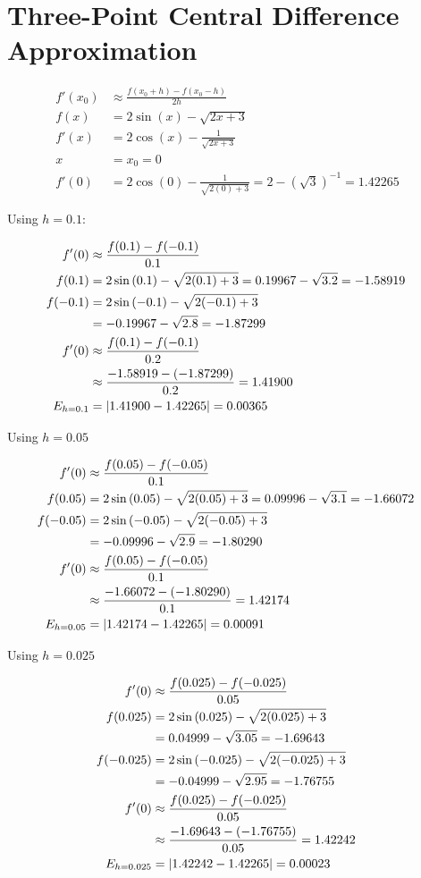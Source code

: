 \section{Three-Point Central Difference Approximation}
	\begin{align}
		f'(x_{0})&\approx \frac{f(x_{0}+h)-f(x_{0}-h)}{2h}& \\
		f(x) &= 2\sin{(x)}-\sqrt{2x+3}& \\
		f'(x) &= 2\cos{(x)} - \frac{1}{\sqrt{2x+3}}&\\
		x &= x_{0} = 0& \\
		f'(0) &= 2\cos{(0)} - \frac{1}{\sqrt{2(0)+3}} = 2 - \left(\sqrt{3}\right)^{-1} = 1.42265&
	\end{align}

	Using $h = 0.1$:

	\begin{align}
		f'(0)&\approx \frac{f(0.1)-f(-0.1)}{0.1}& \\
		f(0.1) &= 2\sin{(0.1)}-\sqrt{2(0.1)+3} = 0.19967 - \sqrt{3.2} = -1.58919& \\
		f(-0.1) &= 2\sin{(-0.1)}-\sqrt{2(-0.1)+3}& \notag \\
		&= -0.19967 - \sqrt{2.8} = -1.87299& \\
		f'(0)&\approx \frac{f(0.1)-f(-0.1)}{0.2}& \notag \\
		&\approx \frac{-1.58919-(-1.87299)}{0.2} = 1.41900& \\
		E_{h=0.1} &= |1.41900-1.42265| = 0.00365&
	\end{align}

	Using $h = 0.05$

	\begin{align}
		f'(0)&\approx \frac{f(0.05)-f(-0.05)}{0.1}& \\
		f(0.05) &= 2\sin{(0.05)}-\sqrt{2(0.05)+3} = 0.09996 - \sqrt{3.1} = -1.66072& \\
		f(-0.05) &= 2\sin{(-0.05)}-\sqrt{2(-0.05)+3}& \notag \\
		&= -0.09996 - \sqrt{2.9} = -1.80290& \\
		f'(0)&\approx \frac{f(0.05)-f(-0.05)}{0.1}& \notag \\
		&\approx \frac{-1.66072-(-1.80290)}{0.1} = 1.42174& \\
		E_{h=0.05} &= |1.42174-1.42265| = 0.00091&
	\end{align}

	Using $h = 0.025$

	\begin{align}
		f'(0)&\approx \frac{f(0.025)-f(-0.025)}{0.05}& \\
		f(0.025) &= 2\sin{(0.025)}-\sqrt{2(0.025)+3}& \notag \\
		&= 0.04999 - \sqrt{3.05} = -1.69643& \\
		f(-0.025) &= 2\sin{(-0.025)}-\sqrt{2(-0.025)+3}& \notag \\
		&= -0.04999 - \sqrt{2.95} = -1.76755& \\
		f'(0)&\approx \frac{f(0.025)-f(-0.025)}{0.05}& \notag \\
		&\approx \frac{-1.69643-(-1.76755)}{0.05} = 1.42242& \\
		E_{h=0.025} &= |1.42242-1.42265| = 0.00023&
	\end{align}
